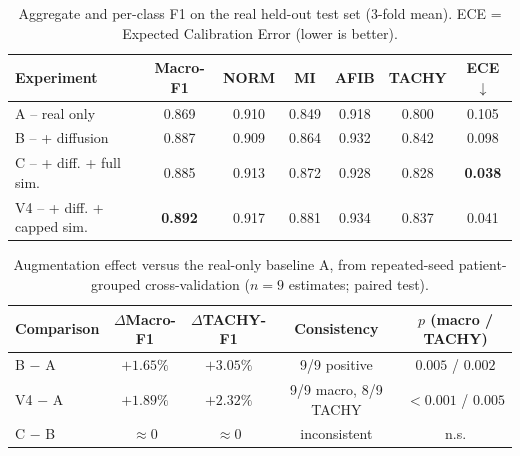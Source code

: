 
\begin{table}[t]
\centering
\caption{Aggregate and per-class F1 on the real held-out test set (3-fold mean).
ECE = Expected Calibration Error (lower is better).}
\label{tab:primary}
\begin{tabular}{lcccccc}
\toprule
Experiment & Macro-F1 & NORM & MI & AFIB & TACHY & ECE $\downarrow$ \\
\midrule
A -- real only            & 0.869 & 0.910 & 0.849 & 0.918 & 0.800 & 0.105 \\
B -- + diffusion          & 0.887 & 0.909 & 0.864 & 0.932 & 0.842 & 0.098 \\
C -- + diff. + full sim.  & 0.885 & 0.913 & 0.872 & 0.928 & 0.828 & \textbf{0.038} \\
V4 -- + diff. + capped sim.& \textbf{0.892} & 0.917 & 0.881 & 0.934 & 0.837 & 0.041 \\
\bottomrule
\end{tabular}
\end{table}

\begin{table}[t]
\centering
\caption{Augmentation effect versus the real-only baseline A, from repeated-seed
patient-grouped cross-validation ($n=9$ estimates; paired test).}
\label{tab:effect}
\begin{tabular}{lcccc}
\toprule
Comparison & $\Delta$Macro-F1 & $\Delta$TACHY-F1 & Consistency & $p$ (macro / TACHY) \\
\midrule
B $-$ A  & $+1.65\%$ & $+3.05\%$ & 9/9 positive & $0.005$ / $0.002$ \\
V4 $-$ A & $+1.89\%$ & $+2.32\%$ & 9/9 macro, 8/9 TACHY & $<0.001$ / $0.005$ \\
C $-$ B  & $\approx 0$ & $\approx 0$ & inconsistent & n.s. \\
\bottomrule
\end{tabular}
\end{table}

